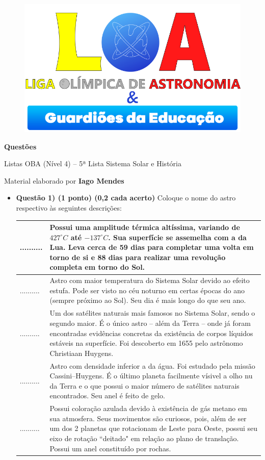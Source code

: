 \documentclass[a4paper, 12pt]{article}
\newcommand{\cabecalho}[4]
{
	\begin{figure}
		\centering
		\href{https://ligaolimpicadeastronomia.com.br/}{\includegraphics[scale=0.6]{./img/logos.png}}
	\end{figure}
	
	\begin{center}
		\begin{large}
			\textbf{#1}	
		\end{large}
			\linebreak Listas OBA (Nível 4) -- #2ª Lista
			\linebreak #3
		\end{center}
	
	\begin{flushright}
		Material elaborado por \textbf{#4}
	\end{flushright}
}
\begin{document}
	\cabecalho{Questões}{5}{Sistema Solar e História}{Iago Mendes}
	
	\begin{itemize}
		\item \textbf{Questão 1) (1 ponto) (0,2 cada acerto)} Coloque o nome do astro respectivo às seguintes descrições:
			\begin{center} \begin{tabular}{|M{0.2\textwidth}|M{0.65\textwidth}|}
				\hline
				.......... & Possui uma amplitude térmica altíssima, variando de $427^{\circ}C$ até $-137^{\circ}C$. Sua superfície se assemelha com a da Lua. Leva cerca de 59 dias para completar uma volta em torno de si e 88 dias para realizar uma revolução completa em torno do Sol. \\ \hline
				.......... & Astro com maior temperatura do Sistema Solar devido ao efeito estufa. Pode ser visto no céu noturno em certas épocas do ano (sempre próximo ao Sol). Seu dia é mais longo do que seu ano. \\ \hline
				.......... & Um dos satélites naturais mais famosos no Sistema Solar, sendo o segundo maior. É o único astro -- além da Terra -- onde já foram encontradas evidências concretas da existência de corpos líquidos estáveis na superfície. Foi descoberto em 1655 pelo astrônomo Christiaan Huygens. \\ \hline
				.......... & Astro com densidade inferior a da água. Foi estudado pela missão Cassini–Huygens. É o último planeta facilmente vísivel a olho nu da Terra e o que possui o maior número de satélites naturais encontrados. Seu anel é feito de gelo. \\ \hline
				.......... & Possui coloração azulada devido à existência de gás metano em sua atmosfera. Seus movimentos são curiosos, pois, além de ser um dos 2 planetas que rotacionam de Leste para Oeste, possui seu eixo de rotação ``deitado" em relação ao plano de translação. Possui um anel constituído por rochas.\\ \hline
			\end{tabular} \end{center}
		

\end{itemize}
\end{document}
